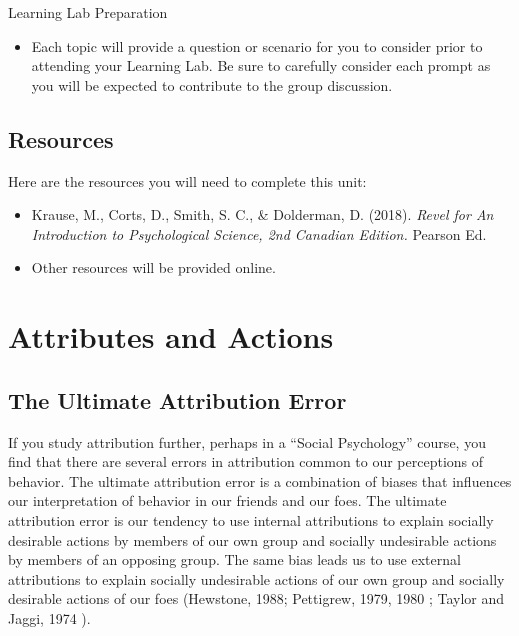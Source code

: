 \documentclass[
]{book}
\providecommand{\tightlist}{%
  \setlength{\itemsep}{0pt}\setlength{\parskip}{0pt}}
\begin{document}
\begin{reflect}
{Learning Lab Preparation}

\begin{itemize}
\tightlist
\item
  Each topic will provide a question or scenario for you to consider prior to attending your Learning Lab. Be sure to carefully consider each prompt as you will be expected to contribute to the group discussion.
\end{itemize}
\end{reflect}

\hypertarget{resources-7}{%
\subsection*{Resources}\label{resources-7}}

Here are the resources you will need to complete this unit:

\begin{itemize}
\tightlist
\item
  Krause, M., Corts, D., Smith, S. C., \& Dolderman, D. (2018). \emph{Revel for An Introduction to Psychological Science, 2nd Canadian Edition.} Pearson Ed.\\
\item
  Other resources will be provided online.
\end{itemize}

\hypertarget{attributes-and-actions}{%
\section{Attributes and Actions}\label{attributes-and-actions}}

\hypertarget{the-ultimate-attribution-error}{%
\subsection*{The Ultimate Attribution Error}\label{the-ultimate-attribution-error}}

If you study attribution further, perhaps in a ``Social Psychology'' course, you find that there are several errors in attribution common to our perceptions of behavior. The ultimate attribution error is a combination of biases that influences our interpretation of behavior in our friends and our foes. The ultimate attribution error is our tendency to use internal attributions to explain socially desirable actions by members of our own group and socially undesirable actions by members of an opposing group. The same bias leads us to use external attributions to explain socially undesirable actions of our own group and socially desirable actions of our foes (Hewstone, 1988; Pettigrew, 1979, 1980 ; Taylor and Jaggi, 1974 ).
\end{document}
